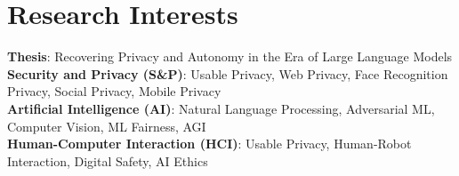 \section{Research Interests}
 \begin{itemize}[leftmargin=0.5cm, label={}]
    \small{\item{
     \textbf{Thesis}{: Recovering Privacy and Autonomy in the 
     Era of Large Language Models} \\
     \textbf{Security and Privacy (S\&P)}{: Usable Privacy, Web Privacy, Face Recognition Privacy, Social Privacy, Mobile Privacy} \\
     \textbf{Artificial Intelligence (AI)}{: Natural Language Processing, Adversarial ML, Computer Vision, ML Fairness, AGI} \\
     \textbf{Human-Computer Interaction (HCI)}{: Usable Privacy, Human-Robot Interaction, Digital Safety, AI Ethics} \\
    }}
 \end{itemize}